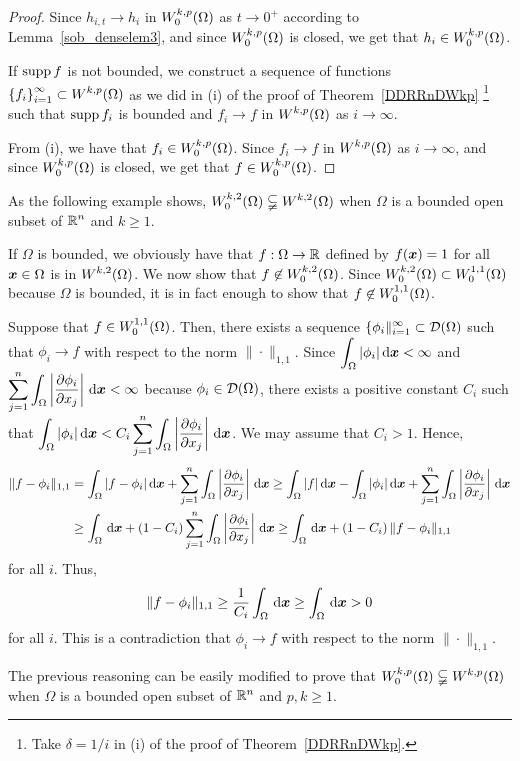 \begin{proof}
Since $h_{i,t} \to h_i$ in $\displaystyle W^{k,p}_0(\Omega)$ as $t \to 0^+$
according to Lemma~\ref{sob_denselem3}, and since 
$\displaystyle W^{k,p}_0(\Omega)$ is closed, we get that
$\displaystyle h_i \in W^{k,p}_0(\Omega)$.

  If $\operatorname{supp} f$ is not bounded, we construct a sequence of functions
$\displaystyle \left\{ f_i \right\}_{i=1}^\infty \subset W^{k,p}(\Omega)$
as we did in (i) of the proof of Theorem~\ref{DDRRnDWkp}
\footnote{Take $\delta = 1/i$ in (i) of the proof of Theorem~\ref{DDRRnDWkp}.}
such that $\operatorname{supp} f_i$ is bounded and
$f_i \to f$ in $\displaystyle W^{k,p}(\Omega)$ as $i \to \infty$.

From (i), we have that $\displaystyle f_i \in W^{k,p}_0(\Omega)$.  Since
$f_i \to f$ in $\displaystyle W^{k,p}(\Omega)$ as $i \to \infty$, and since 
$\displaystyle W^{k,p}_0(\Omega)$ is closed, we get that
$\displaystyle f \in W^{k,p}_0(\Omega)$.
\end{proof}

\begin{egg}
As the following example shows,
$\displaystyle W^{k,2}_0(\Omega) \subsetneqq W^{k,2}(\Omega)$ when $\Omega$ is a
bounded open subset of $\displaystyle \mathbb{R}^n$ and $k\geq 1$.

If $\Omega$ is bounded, we obviously have that $f:\Omega \to \mathbb{R}$
defined by $f({\bm{x}}) = 1$ for all ${\bm{x}} \in \Omega$ is in 
$\displaystyle W^{k,2}(\Omega)$.  We now show that
$\displaystyle f \not\in W_0^{k,2}(\Omega)$.  Since
$\displaystyle W_0^{k,2}(\Omega) \subset W_0^{1,1}(\Omega)$ because
$\Omega$ is bounded, it is in fact enough to
show that $\displaystyle f \not\in W_0^{1,1}(\Omega)$.

Suppose that $\displaystyle f \in W_0^{1,1}(\Omega)$.  Then, there
exists a sequence
$\displaystyle \{\phi_i\|_{i=1}^\infty \subset \mathcal{D}(\Omega)$ such that
$\phi_i \to f$ with respect to the norm $\|\cdot\|_{1,1}$.
Since $\displaystyle \int_{\Omega} |\phi_i| \,\mathrm{d}{{\bm{x}}} < \infty$ and
$\displaystyle \sum_{j=1}^n \int_{\Omega} \left| \frac{\partial{\phi_i}}{\partial x_j}
\right| \,\mathrm{d}{{\bm{x}}} < \infty$ because
$\displaystyle \phi_i \in \mathcal{D}(\Omega)$, there exists a positive constant $C_i$
such that
$\displaystyle \int_{\Omega} |\phi_i| \,\mathrm{d}{{\bm{x}}} < C_i
\sum_{j=1}^n \int_{\Omega} \left| \frac{\partial{\phi_i}}{\partial x_j}
\right| \,\mathrm{d}{{\bm{x}}}$.
We may assume that $C_i > 1$.
Hence,
\begin{align*}
\|f - \phi_i\|_{1,1}
&= \int_{\Omega} |f-\phi_i| \,\mathrm{d}{{\bm{x}}} + \sum_{j=1}^n \int_{\Omega}
\left| \frac{\partial{\phi_i}}{\partial x_j} \right| \,\mathrm{d}{{\bm{x}}}
\geq \int_{\Omega} |f| \,\mathrm{d}{{\bm{x}}} - \int_{\Omega} |\phi_i| \,\mathrm{d}{{\bm{x}}}
+ \sum_{j=1}^n \int_{\Omega}
\left| \frac{\partial{\phi_i}}{\partial x_j} \right| \,\mathrm{d}{{\bm{x}}} \\
&\geq \int_{\Omega} \,\mathrm{d}{{\bm{x}}} + \left( 1- C_i\right)
\sum_{j=1}^n \int_{\Omega} \left| \frac{\partial{\phi_i}}{\partial x_j} \right| \,\mathrm{d}{{\bm{x}}}
\geq \int_{\Omega} \,\mathrm{d}{{\bm{x}}} + \left(1 - C_i\right)
\|f - \phi_i\|_{1,1}
\end{align*}
for all $i$.  Thus,
\[
\|f - \phi_i\|_{1,1} \geq \frac{1}{C_i} \int_{\Omega} \,\mathrm{d}{{\bm{x}}}
\geq \int_{\Omega} \,\mathrm{d}{{\bm{x}}} >  0
\]
for all $i$.  This is a contradiction that
$\phi_i \to f$ with respect to the norm $\|\cdot\|_{1,1}$.

The previous reasoning can be easily modified to prove that
$\displaystyle W^{k,p}_0(\Omega) \subsetneqq W^{k,p}(\Omega)$ when $\Omega$ is a
bounded open subset of $\mathbb{R}^n$ and $p,k\geq 1$.
\end{egg}

